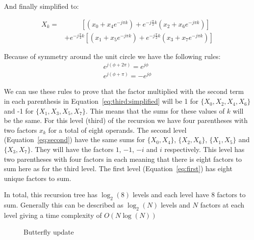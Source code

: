 And finally simplified to:

\begin{equation}
\begin{align}
    X_{k} =&\ \ \ \ \ \ \ \ \ \ \ \left[\left(x_0 + x_4e^{-j\pi k}\right) + e^{-j\frac{\pi}{2}k}\left(x_2 + x_6e^{-j\pi k}\right)\right]\\
           &+ e^{-j\frac{\pi}{4}k}\left[\left(x_1 + x_5e^{-j\pi k}\right) + e^{-j\frac{\pi}{2}k}\left(x_3 + x_7e^{-j\pi k}\right)\right]
\end{align}\label{eq:third:simplified}
\end{equation}

Because of symmetry around the unit circle we have the following rules:
\begin{gather*}
    e^{j(\phi + 2\pi)} = e^{j\phi}\\
    e^{j(\phi + \pi)} = -e^{j\phi}
\end{gather*}

We can use these rules to prove that the factor multiplied with the second term in each parenthesis in Equation~\ref{eq:third:simplified} will be 1 for $\{X_0, X_2, X_4, X_6\}$ and -1 for $\{X_1, X_3, X_5, X_7\}$. This means that the sums for these values of $k$ will be the same. For this level (third) of the recursion we have four parentheses with two factors $x_k$ for a total of eight operands. The second level (Equation~\ref{eq:second}) have the same sums for $\{X_0, X_4\}$, $\{X_2, X_6\}$, $\{X_1, X_5\}$ and $\{X_3, X_7\}$. They will have the factors $1$, $-1$, $-i$ and $i$ respectively. This level has two parentheses with four factors in each meaning that there is eight factors to sum here as for the third level. The first level (Equation~\ref{eq:first}) has eight unique factors to sum.

In total, this recursion tree has $\log_2(8)$ levels and each level have $8$ factors to sum. Generally this can be described as $\log_2(N)$ levels and $N$ factors at each level giving a time complexity of $O(N\log(N))$


\begin{figure}
    \centering
    \caption{Butterfly update}
    \label{fig:butterfly:update}
\end{figure}

